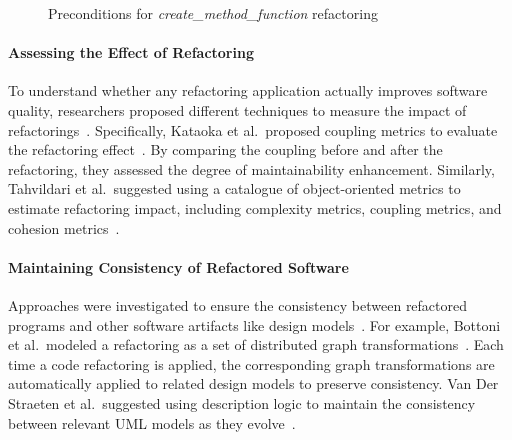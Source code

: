 \documentclass[runningheads,a4paper]{llncs}
\begin{document}
\begin{figure}[!htb]
\centering
{}
\caption{Preconditions for \emph{create\_method\_function} refactoring~\cite{Opdyke1992:ROF}}
\label{fig:preconditions}
\end{figure}

\paragraph{Assessing the Effect of Refactoring} 
To understand whether any refactoring application actually improves software quality, researchers proposed 
different techniques to measure the impact of refactorings~\cite{Kataoka2002:evaluateRefactor,Tahvildari2003:MAE}. Specifically, Kataoka et al.~proposed coupling metrics to evaluate the refactoring effect~\cite{Kataoka2002:evaluateRefactor}. By comparing the coupling before and after the refactoring, they assessed the degree of maintainability enhancement. Similarly, Tahvildari et al.~suggested using a catalogue of object-oriented metrics to estimate refactoring impact, including complexity metrics, coupling metrics, and cohesion metrics~\cite{Tahvildari2003:MAE}. 

\paragraph{Maintaining Consistency of Refactored Software} 
Approaches were investigated to ensure the consistency between refactored programs and other software artifacts like design models~\cite{Bottoni2003:coordinatedTransformation,Straeten2003:UML}. For example, Bottoni et al.~modeled a refactoring as a set of distributed graph transformations~\cite{Bottoni2003:coordinatedTransformation}. Each time a code refactoring is applied, the corresponding graph transformations are automatically applied to related design models to preserve consistency. Van Der Straeten et al.~suggested using description logic to maintain the consistency between relevant UML models as they evolve~\cite{Straeten2003:UML}.
\end{document}
